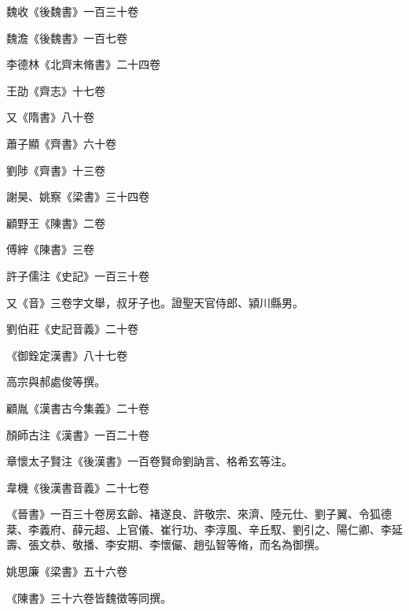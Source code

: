 \begin{pinyinscope}
 魏收《後魏書》一百三十卷



 魏澹《後魏書》一百七卷



 李德林《北齊末脩書》二十四卷



 王劭《齊志》十七卷



 又《隋書》八十卷



 蕭子顯《齊書》六十卷



 劉陟《齊書》十三卷



 謝昊、姚察《梁書》三十四卷



 顧野王《陳書》二卷



 傅縡《陳書》三卷



 許子儒注《史記》一百三十卷



 又《音》三卷字文舉，叔牙子也。證聖天官侍郎、潁川縣男。



 劉伯莊《史記音義》二十卷



 《御銓定漢書》八十七卷



 高宗與郝處俊等撰。



 顧胤《漢書古今集義》二十卷



 顏師古注《漢書》一百二十卷



 章懷太子賢注《後漢書》一百卷賢命劉訥言、格希玄等注。



 韋機《後漢書音義》二十七卷



 《晉書》一百三十卷房玄齡、褚遂良、許敬宗、來濟、陸元仕、劉子翼、令狐德棻、李義府、薛元超、上官儀、崔行功、李淳風、辛丘馭、劉引之、陽仁卿、李延壽、張文恭、敬播、李安期、李懷儼、趙弘智等脩，而名為御撰。



 姚思廉《梁書》五十六卷



 《陳書》三十六卷皆魏徵等同撰。




\end{pinyinscope}
